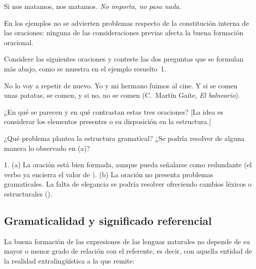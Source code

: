 \begin{exe}
  \ex\label{ex:02-matamos} Si nos matamos, nos matamos.
  \ex\label{ex:02-nopasa} \textit{No importa, no pasa nada}.
\end{exe}

En los ejemplos  no se advierten problemas
respecto de la constitución interna de las oraciones: ninguna de las
consideraciones previas afecta la buena formación oracional.

\begin{ejercicio}\label{ej:02-elegancia}
Considere las siguientes oraciones y conteste las dos preguntas que se formulan
más abajo, como se muestra en el ejemplo resuelto~1.

\begin{exe}
  \ex No lo voy a repetir de nuevo.
  \ex Yo y mi hermano fuimos al cine.
  \ex Y si se comen unas patatas, se comen, y si no, no se comen (C.~Martín
      Gaite, \textit{El balneario}).
\end{exe}

\begin{consignas}
  \item ¿En qué se parecen y en qué contrastan estas tres oraciones? [La idea es
        considerar los elementos presentes o su disposición en la estructura.]
  \item ¿Qué problema plantea la estructura gramatical? ¿Se podría resolver de
        alguna manera lo observado en (a)?
\end{consignas}

\begin{resuelto}
1. (a) La oración está bien formada, aunque pueda señalarse como redundante (el
verbo ya encierra el valor de ). (b) La oración no presenta
problemas gramaticales. La falta de elegancia se podría resolver ofreciendo
cambios léxicos o estructurales ().
\end{resuelto}
\end{ejercicio}

\subsection{Gramaticalidad y significado referencial}

La buena formación de las expresiones de las lenguas naturales no depende de su
mayor o menor grado de relación con el referente, es decir, con aquella entidad
de la realidad extralingüística a la que remite:

